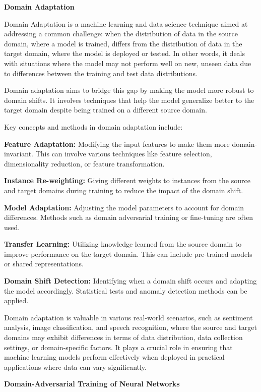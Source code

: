\documentclass[nonacm, sigconf]{acmart}
\begin{document}
\noindent\textbf{Domain Adaptation}

\noindent Domain Adaptation is a machine learning and data science technique aimed at addressing a common challenge: when the distribution of data in the source domain, where a model is trained, differs from the distribution of data in the target domain, where the model is deployed or tested. In other words, it deals with situations where the model may not perform well on new, unseen data due to differences between the training and test data distributions.

\noindent Domain adaptation aims to bridge this gap by making the model more robust to domain shifts. It involves techniques that help the model generalize better to the target domain despite being trained on a different source domain.

\noindent Key concepts and methods in domain adaptation include:

\textbf{Feature Adaptation:} Modifying the input features to make them more domain-invariant. This can involve various techniques like feature selection, dimensionality reduction, or feature transformation.\cite{16}

\textbf{Instance Re-weighting:} Giving different weights to instances from the source and target domains during training to reduce the impact of the domain shift.

\textbf{Model Adaptation:} Adjusting the model parameters to account for domain differences. Methods such as domain adversarial training or fine-tuning are often used.\cite{17}

\textbf{Transfer Learning:} Utilizing knowledge learned from the source domain to improve performance on the target domain. This can include pre-trained models or shared representations.\cite{18}

\textbf{Domain Shift Detection:} Identifying when a domain shift occurs and adapting the model accordingly. Statistical tests and anomaly detection methods can be applied.

\noindent Domain adaptation is valuable in various real-world scenarios, such as sentiment analysis, image classification, and speech recognition, where the source and target domains may exhibit differences in terms of data distribution, data collection settings, or domain-specific factors. It plays a crucial role in ensuring that machine learning models perform effectively when deployed in practical applications where data can vary significantly.

\noindent\textbf{Domain-Adversarial Training of Neural Networks}
\end{document}
